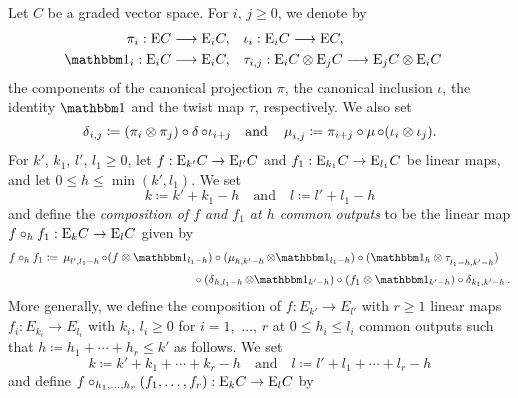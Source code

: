 \documentclass[\MainFolder/Text.tex]{subfiles}
\begin{document}
\begin{Definition} \label{Def:CircS}
Let $C$ be a graded vector space. For $i$, $j\ge 0$, we denote by 
\begin{align*} \pi_i : \Ext C \longrightarrow \Ext_i C,& \quad \iota_i : \Ext_i C \longrightarrow \Ext C, \\
 \Id_i : \Ext_i C \longrightarrow \Ext_i C,& \quad \begin{aligned}[t]\tau_{i,j}: \Ext_i C\otimes \Ext_j C &\longrightarrow \Ext_j C \otimes \Ext_i C \end{aligned}
 \end{align*}
the components of the canonical projection $\pi$, the canonical inclusion $\iota$, the identity $\Id$ and the twist map $\tau$, respectively. We also set 
\[ \operatorname{\delta}_{i,j} \coloneqq (\pi_i \otimes \pi_j)\circ \operatorname{\delta}\circ \iota_{i+j} \quad\text{and}\quad \operatorname{\mu}_{i,j}\coloneqq \pi_{i+j}\circ \operatorname{\mu}\circ (\iota_i \otimes \iota_j). \]
For $k'$, $k_1$, $l'$, $l_1\ge 0$, let $f: \mathrm{E}_{k'}C \rightarrow \mathrm{E}_{l'} C$ and $f_1: \mathrm{E}_{k_1} C \rightarrow \mathrm{E}_{l_1} C$ be linear maps, and let $0 \le h \le \min(k', l_1)$. We set  
\[k \coloneqq k' + k_1 - h \quad\text{and}\quad l \coloneqq l' + l_1 - h \]
and define the \emph{composition of $f$ and $f_1$ at $h$ common outputs} to be the linear map $f \circ_h f_1: \mathrm{E}_k C \rightarrow \mathrm{E}_l C$ given by 
\begin{equation}\label{Eq:CompositionSimple}
f \circ_h f_1 \coloneqq \begin{multlined}[t]\Prod_{l', l_1 - h} \circ (f\otimes \Id_{l_1-h})\circ (\Prod_{h, k'-h}\otimes \Id_{l_1-h})\circ (\Id_{h} \otimes \tau_{\rule{0pt}{7pt}l_1-h,k'-h}) \\[\jot] \circ (\CoProd_{h,l_1-h}\otimes \Id_{k'-h}) \circ (f_1 \otimes \Id_{k'-h} ) \circ \CoProd_{k_1, k'-h}. \end{multlined}
\end{equation}
More generally, we define the composition of $f: E_{k'}\rightarrow E_{l'}$ with $r\ge 1$ linear maps $f_{i}: E_{k_i} \rightarrow E_{l_i}$ with $k_i$, $l_i \ge 0$ for $i=1$,~$\dotsc$, $r$ at $0 \le h_i \le l_i$ common outputs such that $h\coloneqq h_1 + \dotsb + h_r \le k'$ as follows. We set 
\[ k\coloneqq k' + k_1 + \dotsb + k_r-h\quad\text{and}\quad l\coloneqq l' +  l_1 + \dotsb + l_r  - h \]
and define $f\circ_{h_1, \dotsc, h_r}(f_1, \dotsc, f_r): \mathrm{E}_k C \rightarrow \mathrm{E}_l C$ by

\end{Definition}
\end{document}
